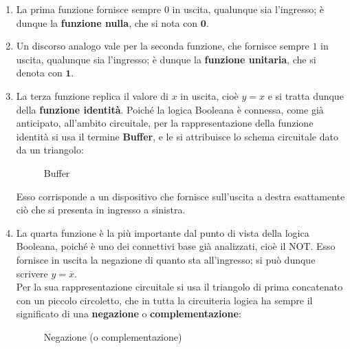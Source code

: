 \documentclass[a4paper]{extarticle}
\begin{document}
\noindent
\begin{enumerate}
    \item La prima funzione fornisce sempre \(0\) in uscita, qualunque sia l’ingresso; è dunque la \textbf{funzione nulla}, che si nota con \(\textbf{0}\).

    \item Un discorso analogo vale per la seconda funzione, che fornisce sempre \(1\) in uscita, qualunque sia l'ingresso; è dunque la \textbf{funzione unitaria}, che si denota con \(\textbf{1}\).

    \item La terza funzione replica il valore di \(x\) in uscita, cioè \(y = x\) e si tratta dunque della \textbf{funzione identità}. Poiché la logica Booleana è connessa, come già anticipato, all’ambito circuitale, per la rappresentazione della funzione identità si usa il termine \textbf{Buffer}, e le si attribuisce lo schema circuitale dato da un triangolo:

            \begin{figure}[H]
                \centering
                \caption{Buffer}
                \label{fig:buffer}
            \end{figure}

    \noindent
    Esso corrisponde a un dispositivo che fornisce sull’uscita a destra esattamente ciò che si presenta in ingresso a sinistra.

    \item La quarta funzione è la più importante dal punto di vista della logica Booleana, poiché è uno dei connettivi base già analizzati, cioè il NOT. Esso fornisce in uscita la negazione di quanto sta all’ingresso; si può dunque scrivere \(y = \overline{x}\).\\
    Per la sua rappresentazione circuitale si usa il triangolo di prima concatenato con un piccolo circoletto, che in tutta la circuiteria logica ha sempre il significato di una \textbf{negazione} o \textbf{complementazione}:

        \begin{figure}[H]
        \centering
        \caption{Negazione (o complementazione)}
        \label{fig:negazione_o_complementazione}
        \end{figure}
\end{enumerate}
\end{document}
